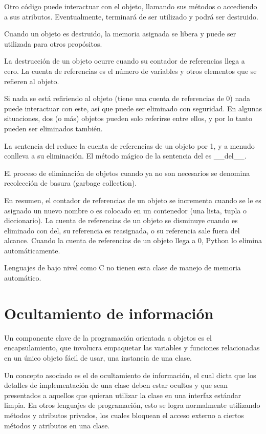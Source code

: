 \documentclass{report}
\begin{document}
Otro código puede interactuar con el objeto, llamando sus métodos o accediendo a sus atributos. Eventualmente, terminará de ser utilizado y podrá ser destruido.\smallskip

Cuando un objeto es destruido, la memoria asignada se libera y puede ser utilizada para otros propósitos.\smallskip

La destrucción de un objeto ocurre cuando su contador de referencias llega a cero. La cuenta de referencias es el número de variables y otros elementos que se refieren al objeto.\smallskip

Si nada se está refiriendo al objeto (tiene una cuenta de referencias de 0) nada puede interactuar con este, así que puede ser eliminado con seguridad.
En algunas situaciones, dos (o más) objetos pueden solo referirse entre ellos, y por lo tanto pueden ser eliminados también.\smallskip

La sentencia del reduce la cuenta de referencias de un objeto por 1, y a menudo conlleva a su eliminación. El método mágico de la sentencia del es \_\_del\_\_.\smallskip

El proceso de eliminación de objetos cuando ya no son necesarios se denomina recolección de basura (garbage collection).\smallskip

En resumen, el contador de referencias de un objeto se incrementa cuando se le es asignado un nuevo nombre o es colocado en un contenedor (una lista, tupla o diccionario). La cuenta de referencias de un objeto se disminuye cuando es eliminado con del, su referencia es reasignada, o su referencia sale fuera del alcance. Cuando la cuenta de referencias de un objeto llega a 0, Python lo elimina automáticamente.


Lenguajes de bajo nivel como C no tienen esta clase de manejo de memoria automático.

\section{Ocultamiento de información}

Un componente clave de la programación orientada a objetos es el encapsulamiento, que involucra empaquetar las variables y funciones relacionadas en un único objeto fácil de usar, una instancia de una clase.\smallskip

Un concepto asociado es el de ocultamiento de información, el cual dicta que los detalles de implementación de una clase deben estar ocultos y que sean presentados a aquellos que quieran utilizar la clase en una interfaz estándar limpia. En otros lenguajes de programación, esto se logra normalmente utilizando métodos y atributos privados, los cuales bloquean el acceso externo a ciertos métodos y atributos en una clase.\smallskip
\end{document}
